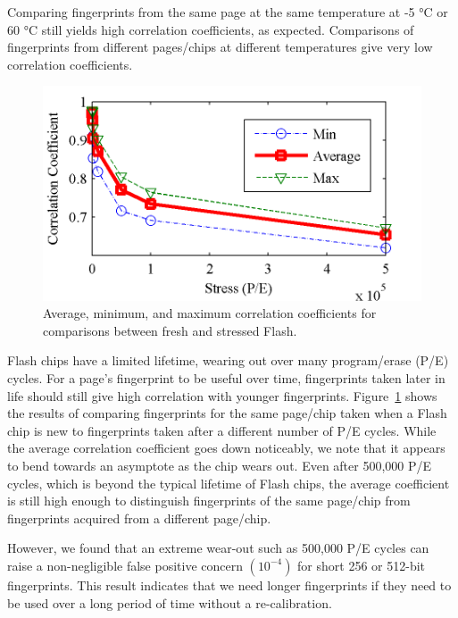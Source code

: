 Comparing fingerprints from the same page at the same temperature at -5 °C or 60 °C still yields high correlation coefficients, as expected. Comparisons of fingerprints from different pages/chips at different temperatures give very low correlation coefficients.

\begin{figure}
\begin{center} 
\includegraphics[width=\mywidth]{figs/fprints_aging.png} 
\caption{Average, minimum, and maximum correlation coefficients for comparisons between fresh and stressed Flash.}
\label{fig:fprints_aging} 
\vspace{-0.1in}
\end{center} 
\end{figure} 

Flash chips have a limited lifetime, wearing out over many program/erase (P/E) cycles. For a page’s fingerprint to be useful over time, fingerprints taken later in life should still give high correlation with younger fingerprints. Figure~\ref{fig:fprints_aging} shows the results of comparing fingerprints for the same page/chip taken when a Flash chip is new to fingerprints taken after a different number of P/E cycles. While the average correlation coefficient goes down noticeably, we note that it appears to bend towards an asymptote as the chip wears out. Even after 500,000 P/E cycles, which is beyond the typical lifetime of Flash chips, the average coefficient is still high enough to distinguish fingerprints of the same page/chip from fingerprints acquired from a different page/chip.

However, we found that an extreme wear-out such as 500,000 P/E cycles can raise a non-negligible false positive concern $(10^{-4})$ for short 256 or 512-bit fingerprints. This result indicates that we need longer fingerprints if they need to be used over a long period of time without a re-calibration.

